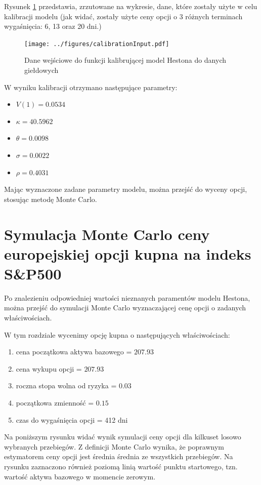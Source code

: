 \documentclass{pracamgr}
\begin{document}
Rysunek \ref{fig:calibration} przedstawia, zrzutowane na wykresie, dane, które
zostały użyte w celu kalibracji modelu (jak widać, zostały użyte ceny 
opcji o 3 różnych terminach wygaśnięcia: 
6, 13 oraz 20 dni.)

\begin{figure}
  \centering
  \texttt{[image: ../figures/calibrationInput.pdf]}
  \caption{Dane wejściowe do funkcji kalibrującej model Hestona do danych giełdowych}
  \label{fig:calibration}
\end{figure}

W wyniku kalibracji otrzymano następujące parametry:


\begin{itemize}
  \item $V(1) = 0.0534 $
  \item $\kappa = 40.5962$
  \item $\theta = 0.0098$
  \item $\sigma = 0.0022$
  \item $\rho = 0.4031$
\end{itemize}


Mając wyznaczone zadane parametry modelu, można przejść do wyceny opcji, stosując metodę Monte Carlo.


\section{Symulacja Monte Carlo ceny europejskiej opcji kupna na indeks S\&P500}

Po znalezieniu odpowiedniej wartości nieznanych paramentów modelu Hestona, można 
przejść do symulacji Monte Carlo wyznaczającej cenę opcji o zadanych właściwościach.

W tym rozdziale wycenimy opcję kupna o następujących właściwościach:
\begin{enumerate}
  \item cena początkowa aktywa bazowego = $207.93$
  \item cena wykupu opcji = $207.93$ 
  \item roczna stopa wolna od ryzyka = $0.03$
  \item początkowa zmienność =  $0.15$
  \item czas do wygaśnięcia opcji = 412 dni
\end{enumerate}
 
Na poniższym rysunku widać wynik symulacji ceny opcji dla kilkuset losowo wybranych przebiegów.
Z definicji Monte Carlo wynika, że poprawnym estymatorem ceny
opcji jest średnia średnia ze wszystkich przebiegów.
Na rysunku zaznaczono również poziomą linią wartość punktu startowego, tzn. wartość 
aktywa bazowego w momencie zerowym.
\end{document}
